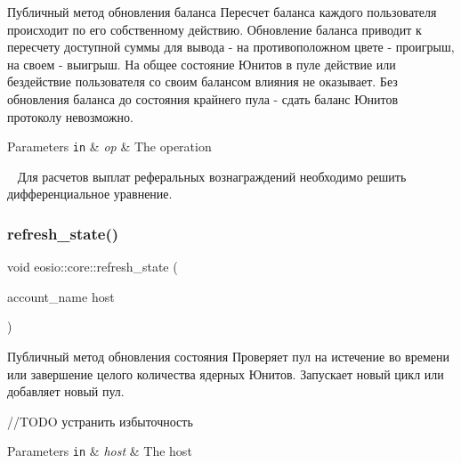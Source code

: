 Публичный метод обновления баланса Пересчет баланса каждого пользователя происходит по его собственному действию. Обновление баланса приводит к пересчету доступной суммы для вывода -\/ на противоположном цвете -\/ проигрыш, на своем -\/ выигрыш. На общее состояние Юнитов в пуле действие или бездействие пользователя со своим балансом влияния не оказывает. Без обновления баланса до состояния крайнего пула -\/ сдать баланс Юнитов протоколу невозможно. 


\begin{DoxyParams}[1]{Parameters}
\mbox{\tt in}  & {\em op} & The operation \\
\hline
\end{DoxyParams}
~\newline
Для расчетов выплат реферальных вознаграждений необходимо решить дифференциальное уравнение.\mbox{\label{structeosio_1_1core_afcfd6d8fd630694c723ff06e4cd8cdfe}} 
\subsubsection{\texorpdfstring{refresh\+\_\+state()}{refresh\_state()}}
{\footnotesize\ttfamily void eosio\+::core\+::refresh\+\_\+state (\begin{DoxyParamCaption}\item[{account\+\_\+name}]{host }\end{DoxyParamCaption})\hspace{0.3cm}{\ttfamily [inline]}}



Публичный метод обновления состояния Проверяет пул на истечение во времени или завершение целого количества ядерных Юнитов. Запускает новый цикл или добавляет новый пул. 

//\+T\+O\+DO устранить избыточность


\begin{DoxyParams}[1]{Parameters}
\mbox{\tt in}  & {\em host} & The host \\
\hline
\end{DoxyParams}
\mbox{\label{structeosio_1_1core_ad6781ce293510a94cc421d386c9aae92}} 
